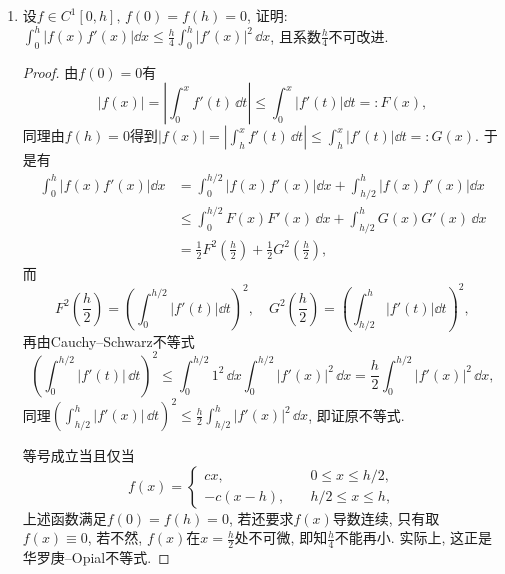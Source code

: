 \begin{quizb}
\begin{enumerate}
\item 设\(f\in C^1[0,h],\,f(0)=f(h)=0\), 
证明: \(\int_{0}^{h}\left|f(x)f'(x)\right|\dd x
\leqslant\frac{h}{4}\int_{0}^{h}|f'(x)|^2\,\dd x\), 且系数\(\frac{h}{4}\)不可改进.
\begin{proof}
由\(f(0)=0\)有\[\left|f(x)\right|=\left|\int_{0}^{x}f'(t)\,\dd t\right|
\leqslant\int_{0}^{x}\left|f'(t)\right|\dd t=:F(x),\]
同理由\(f(h)=0\)得到\(\left|f(x)\right|=\left|\int_{h}^{x}f'(t)\,\dd t\right|
\leqslant\int_{h}^{x}\left|f'(t)\right|\dd t=:G(x)\). 于是有\[\begin{split}
\int_{0}^{h}\left|f(x)f'(x)\right|\dd x
&=\int_{0}^{h/2}\left|f(x)f'(x)\right|\dd x+\int_{h/2}^{h}\left|f(x)f'(x)\right|\dd x\\
&\leqslant\int_{0}^{h/2}F(x)F'(x)\,\dd x+\int_{h/2}^{h}G(x)G'(x)\,\dd x\\
&=\frac{1}{2}F^2\left(\frac{h}{2}\right)+\frac{1}{2}G^2\left(\frac{h}{2}\right),
\end{split}\]而\[F^2\left(\frac{h}{2}\right)
=\left(\int_{0}^{h/2}\left|f'(t)\right|\dd t\right)^2,\quad G^2\left(\frac{h}{2}\right)
=\left(\int_{h/2}^{h}\left|f'(t)\right|\dd t\right)^2,\]
再由Cauchy--Schwarz不等式\[\left(\int_{0}^{h/2}|f'(t)|\,\dd t\right)^2
\leqslant\int_{0}^{h/2}1^2\,\dd x\int_{0}^{h/2}|f'(x)|^2\,\dd x
=\frac{h}{2}\int_{0}^{h/2}|f'(x)|^2\,\dd x,\]
同理\(\left(\int_{h/2}^{h}|f'(x)|\,\dd t\right)^2
\leqslant\frac{h}{2}\int_{h/2}^{h}|f'(x)|^2\,\dd x\), 即证原不等式.

等号成立当且仅当\[f(x)=\begin{cases}
cx,\quad& 0\leqslant x\leqslant h/2,\\
-c(x-h),\quad& h/2\leqslant x\leqslant h,
\end{cases}\]上述函数满足\(f(0)=f(h)=0\), 若还要求\(f(x)\)导数连续, 
只有取\(f(x)\equiv 0\), 若不然, \(f(x)\)在\(x=\frac{h}{2}\)处不可微, 
即知\(\frac{h}{4}\)不能再小. 实际上, 这正是华罗庚--Opial不等式.
\end{proof}


\end{enumerate}
\end{quizb}
